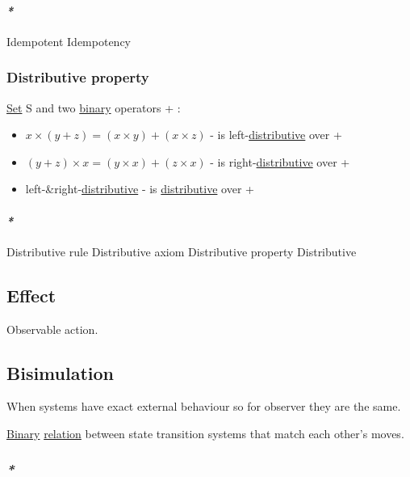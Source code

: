\documentclass[a4paper,14pt,oneside]{book}
\begin{document}
\paragraph{\emph{*}}
\label{sec:org4a7e48e}

\label{org9475789}Idempotent
\label{org5da665a}Idempotency

\subsubsection{\label{org69be560}Distributive property}
\label{sec:orgc2c52ed}
\hyperref[org1c733ad]{Set} S and two \hyperref[orgf1ef660]{binary} operators + \texttimes{}:

\begin{itemize}
\item \(x \times (y + z) = (x \times y) + (x \times z)\) - \texttimes{} is left-\hyperref[org0210d53]{distributive} over +
\item \((y + z) \times x = (y \times x) + (z \times x)\) - \texttimes{} is right-\hyperref[org0210d53]{distributive} over +
\item left-\&right-\hyperref[org0210d53]{distributive} - \texttimes{} is \hyperref[org0210d53]{distributive} over +
\end{itemize}

\paragraph{\emph{*}}
\label{sec:orge801a18}

\label{org3156b10}Distributive rule
\label{orgdb492a4}Distributive axiom
\label{org29911bc}Distributive property
\label{org0210d53}Distributive

\subsection{\label{org5c00975}Effect}
\label{sec:org61a462b}
Observable action.

\subsection{\label{org083b10c}Bisimulation}
\label{sec:org3ad52e6}
When systems have exact external behaviour so for observer they are the same.

\hyperref[orgf1ef660]{Binary} \hyperref[org9ac4321]{relation} between state transition systems that match each other's moves.

\subsubsection{\emph{*}}
\label{sec:orga821f96}
\end{document}
